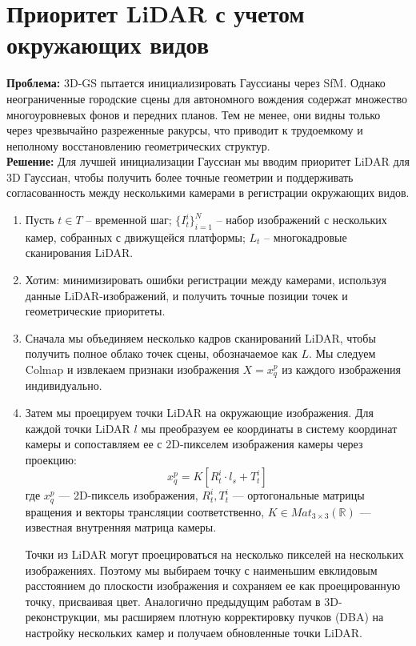 \section{Приоритет LiDAR с учетом окружающих видов}
\textbf{Проблема:} 3D-GS пытается инициализировать Гауссианы через SfM. Однако неограниченные городские сцены для автономного вождения содержат множество многоуровневых фонов и передних планов. Тем не менее, они видны только через чрезвычайно разреженные ракурсы, что приводит к трудоемкому и неполному восстановлению геометрических структур.\\
\textbf{Решение:} 
Для лучшей инициализации Гауссиан мы вводим приоритет LiDAR для 3D Гауссиан, чтобы получить более точные геометрии и поддерживать согласованность между несколькими камерами в регистрации окружающих видов. 
\begin{enumerate}
    \item Пусть $t \in T$ -- временной шаг; $\{I_t^i\}_{i = 1}^N$ -- набор изображений с нескольких камер, собранных с движущейся платформы; $L_t$ -- многокадровые сканирования LiDAR.
    \item Хотим: минимизировать ошибки регистрации между камерами, используя данные LiDAR-изображений, и получить точные позиции точек и геометрические приоритеты.
    \item Сначала мы объединяем несколько кадров сканирований LiDAR, чтобы получить полное облако точек сцены, обозначаемое как $L$. Мы следуем Colmap и извлекаем признаки изображения $X = x_q^p$ из каждого изображения индивидуально.
    \item Затем мы проецируем точки LiDAR на окружающие изображения. Для каждой точки LiDAR $l$ мы преобразуем ее координаты в систему координат камеры и сопоставляем ее с 2D-пикселем изображения камеры через проекцию:
    $$x_q^p = K[R_t^i\cdot  l_s + T_t^i]$$
    где $x_q^p$ — 2D-пиксель изображения, $R_t^i, T_t^i$ — ортогональные матрицы вращения и векторы трансляции соответственно, $K \in Mat_{3\times 3}(\mathbb{R} )$ — известная внутренняя матрица камеры. 
    
    Точки из LiDAR могут проецироваться на несколько пикселей на нескольких изображениях. Поэтому мы выбираем точку с наименьшим евклидовым расстоянием до плоскости изображения и сохраняем ее как проецированную точку, присваивая цвет. Аналогично предыдущим работам в 3D-реконструкции, мы расширяем плотную корректировку пучков (DBA) на настройку нескольких камер и получаем обновленные точки LiDAR.
\end{enumerate}


